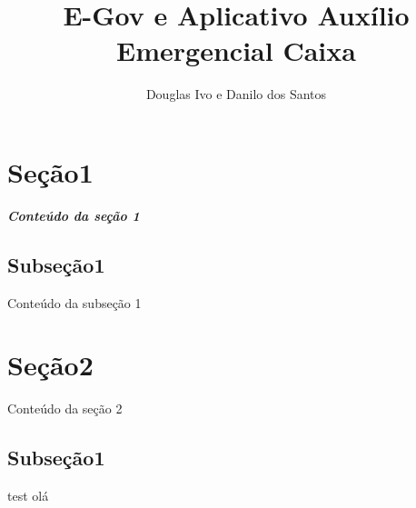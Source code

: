 \documentclass{article}
\begin{document}
\title{E-Gov e Aplicativo Auxílio Emergencial Caixa}
\author{Douglas Ivo e Danilo dos Santos}

\maketitle
\tableofcontents
\pagebreak

\section{Seção1}
\textit{\textbf{Conteúdo da seção 1}}


\subsection{Subseção1}
Conteúdo da subseção 1

\section{Seção2}
Conteúdo da seção 2
\subsection{Subseção1}
test
olá
\end{document}
